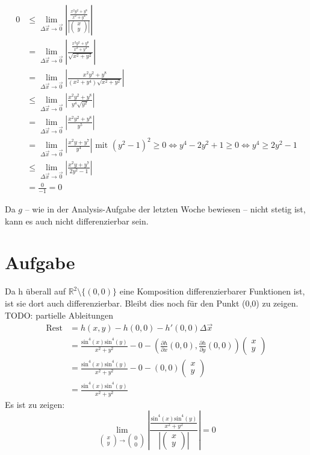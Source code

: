 \documentclass[10pt,a4paper,parskip=half]{scrartcl}
\begin{document}
\begin{enumerate}[(i)]
\begin{align*}
0 &\le \lim_{\Delta \vec x \to \vec 0} \left|\frac{\frac{x^2y^2+y^8}{x^2 + y^4}}{\left|\begin{pmatrix}x\\y\end{pmatrix}\right|}\right|\\
&= \lim_{\Delta \vec x \to \vec 0} \left|\frac{\frac{x^2y^2+y^8}{x^2 + y^4}}{\sqrt{x^2+y^2}}\right| \\
&= \lim_{\Delta \vec x \to \vec 0} \left|\frac{x^2y^2+y^8}{(x^2 + y^4)\sqrt{x^2+y^2}}\right| \\
&\le \lim_{\Delta \vec x \to \vec 0} \left|\frac{x^2y^2+y^8}{y^4\sqrt{y^2}}\right| \\
&= \lim_{\Delta \vec x \to \vec 0} \left|\frac{x^2y^2+y^8}{y^5}\right| \\
&= \lim_{\Delta \vec x \to \vec 0} \left|\frac{x^2y+y^7}{y^4}\right| \text{ mit } (y^2 -1)^2 \ge 0 \Leftrightarrow y^4 - 2y^2 + 1 \ge 0 \Leftrightarrow y^4 \ge 2y^2 -1\\
&\le \lim_{\Delta \vec x \to \vec 0} \left|\frac{x^2y+y^7}{2y^2 -1}\right| \\
&= \frac{0}{-1} = 0
\end{align*}

Da $g$ -- wie in der Analysis-Aufgabe der letzten Woche bewiesen -- nicht stetig ist, kann es auch nicht differenzierbar sein.
\newpage
\section{Aufgabe}
Da h überall auf $\mathbb R^2\setminus{\{(0,0)\}}$ eine Komposition differenzierbarer Funktionen ist, ist sie dort auch differenzierbar. Bleibt dies noch für den Punkt (0,0) zu zeigen.
TODO: partielle Ableitungen
\begin{align*}
\text{Rest} &= h(x,y) - h(0,0) - h'(0,0) \Delta \vec x\\
&= \frac{\text{sin}^4(x)\text{sin}^4(y)}{x^2 + y^2} - 0 - \left(\frac{\partial h}{\partial x}(0,0),\frac{\partial h}{\partial y}(0,0)\right) \begin{pmatrix}x\\y\end{pmatrix}\\
&= \frac{\text{sin}^4(x)\text{sin}^4(y)}{x^2 + y^2} - 0 - (0,0) \begin{pmatrix}x\\y\end{pmatrix}\\
&= \frac{\text{sin}^4(x)\text{sin}^4(y)}{x^2 + y^2}
\end{align*}
Es ist zu zeigen: $$\lim_{\begin{pmatrix}x\\y\end{pmatrix} \to \begin{pmatrix}0\\0\end{pmatrix}} \left|\frac{\frac{\text{sin}^4(x)\text{sin}^4(y)}{x^2 + y^2}}{\left|\begin{pmatrix}x\\y\end{pmatrix}\right|}\right| = 0$$


\end{enumerate}
\end{document}
